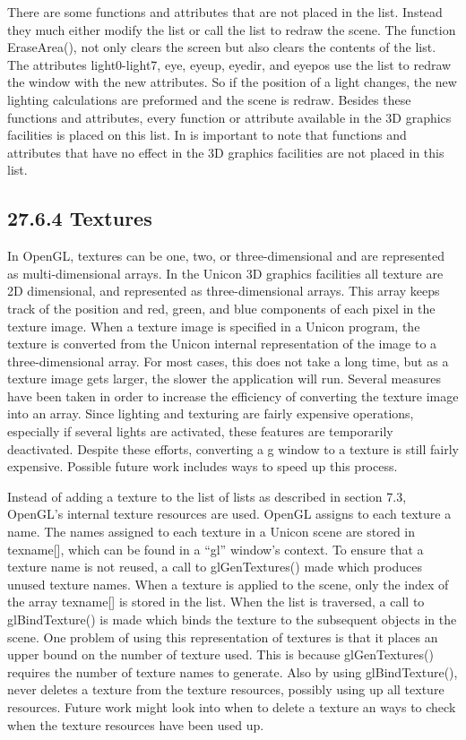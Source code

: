 There are some functions and attributes that are not placed in the
list. Instead they much either modify the list or call the list to
redraw the scene. The function \textsf{EraseArea()}, not only clears
the screen but also clears the contents of the list. The attributes
\textsf{light0-light7}, \textsf{eye}, \textsf{eyeup}, \textsf{eyedir},
and \textsf{eyepos} use the list to redraw the window with the new
attributes. So if the position of a light changes, the new lighting
calculations are preformed and the scene is redraw. Besides these
functions and attributes, every function or attribute available in the
3D graphics facilities is placed on this list. In is important to note
that functions and attributes that have no effect in the 3D graphics
facilities are not placed in this list.

\subsection[27.6.4 Textures]{27.6.4 Textures}

In OpenGL, textures can be one, two, or three-dimensional and are
represented as multi-dimensional arrays. In the Unicon 3D graphics
facilities all texture are 2D dimensional, and represented as
three-dimensional arrays. This array keeps track of the position and
red, green, and blue components of each pixel in the texture
image. When a texture image is specified in a Unicon program, the
texture is converted from the Unicon internal representation of the
image to a three-dimensional array. For most cases, this does not take
a long time, but as a texture image gets larger, the slower the
application will run. Several measures have been taken in order to
increase the efficiency of converting the texture image into an
array. Since lighting and texturing are fairly expensive operations,
especially if several lights are activated, these features are
temporarily deactivated. Despite these efforts, converting a
{\textquotedbl}\textsf{g{\textquotedbl}} window to a texture is still
fairly expensive. Possible future work includes ways to speed up this
process.

Instead of adding a texture to the list of lists as described in
section 7.3, OpenGL's internal texture resources are used. OpenGL
assigns to each texture a name. The names assigned to each texture in
a Unicon scene are stored in \textsf{texname[]}, which can be found in
a \textsf{``gl''} window's context. To ensure that a texture name is
not reused, a call to \textsf{glGenTextures()} made which produces
unused texture names. When a texture is applied to the scene, only the
index of the array \textsf{texname[]} is stored in the list. When the
list is traversed, a call to \textsf{glBindTexture()} is made which
binds the texture to the subsequent objects in the scene. One problem
of using this representation of textures is that it places an upper
bound on the number of texture used. This is because
\textsf{glGenTextures()} requires the number of texture names to
generate. Also by using \textsf{glBindTexture()}, never deletes a
texture from the texture resources, possibly using up all texture
resources. Future work might look into when to delete a texture an
ways to check when the texture resources have been used up.


